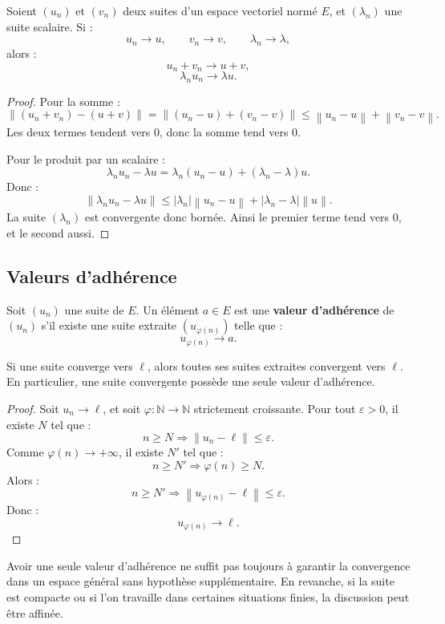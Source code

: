 \documentclass[11pt,a4paper]{article}
\newcommand{\N}{\mathbb N}
\newcommand{\norme}[1]{\left\lVert #1 \right\rVert}
\begin{document}
\begin{theorembox}
Soient \((u_n)\) et \((v_n)\) deux suites d'un espace vectoriel normé \(E\), et \((\lambda_n)\) une suite scalaire.  
Si :
\[
u_n\to u,\qquad v_n\to v,\qquad \lambda_n\to \lambda,
\]
alors :
\[
u_n+v_n\to u+v,
\]
\[
\lambda_n u_n\to \lambda u.
\]
\end{theorembox}

\begin{proof}
Pour la somme :
\[
\norme{(u_n+v_n)-(u+v)}
=\norme{(u_n-u)+(v_n-v)}
\leq \norme{u_n-u}+\norme{v_n-v}.
\]
Les deux termes tendent vers \(0\), donc la somme tend vers \(0\).

Pour le produit par un scalaire :
\[
\lambda_n u_n-\lambda u
=
\lambda_n(u_n-u)+(\lambda_n-\lambda)u.
\]
Donc :
\[
\norme{\lambda_n u_n-\lambda u}
\leq |\lambda_n|\norme{u_n-u}+|\lambda_n-\lambda|\norme{u}.
\]
La suite \((\lambda_n)\) est convergente donc bornée. Ainsi le premier terme tend vers \(0\), et le second aussi.
\end{proof}

\subsection{Valeurs d'adhérence}

\begin{definitionbox}
Soit \((u_n)\) une suite de \(E\).  
Un élément \(a\in E\) est une \textbf{valeur d'adhérence} de \((u_n)\) s'il existe une suite extraite \((u_{\varphi(n)})\) telle que :
\[
u_{\varphi(n)}\to a.
\]
\end{definitionbox}

\begin{theorembox}
Si une suite converge vers \(\ell\), alors toutes ses suites extraites convergent vers \(\ell\).  
En particulier, une suite convergente possède une seule valeur d'adhérence.
\end{theorembox}

\begin{proof}
Soit \(u_n\to\ell\), et soit \(\varphi:\N\to\N\) strictement croissante.  
Pour tout \(\varepsilon>0\), il existe \(N\) tel que :
\[
n\geq N\Rightarrow \norme{u_n-\ell}\leq\varepsilon.
\]
Comme \(\varphi(n)\to+\infty\), il existe \(N'\) tel que :
\[
n\geq N'\Rightarrow \varphi(n)\geq N.
\]
Alors :
\[
n\geq N'\Rightarrow \norme{u_{\varphi(n)}-\ell}\leq\varepsilon.
\]
Donc :
\[
u_{\varphi(n)}\to\ell.
\]
\end{proof}

\begin{erreurbox}
Avoir une seule valeur d'adhérence ne suffit pas toujours à garantir la convergence dans un espace général sans hypothèse supplémentaire.  
En revanche, si la suite est compacte ou si l'on travaille dans certaines situations finies, la discussion peut être affinée.
\end{erreurbox}
\end{document}
